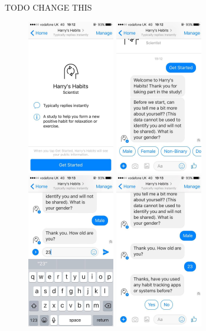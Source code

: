 
TODO CHANGE THIS
\begin{figure}[H]
  \centering
  \includegraphics[width=1.5in]{resources/design/process/1.jpg}
  \hspace{10px}
  \includegraphics[width=1.5in]{resources/design/process/2.jpg}
  \hspace{10px}
  \includegraphics[width=1.5in]{resources/design/process/3.jpg}
  \hspace{10px}
  \includegraphics[width=1.5in]{resources/design/process/4.jpg}

\end{figure}
